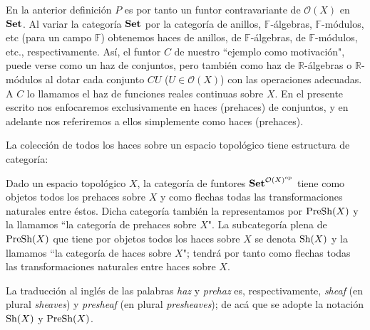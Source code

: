 En la anterior definición $P$ es por tanto un funtor contravariante de $\mathcal{O}(X)$ en $\normalfont{\textbf{Set}}$. Al variar la categoría $\normalfont{\textbf{Set}}$ por la categoría de anillos, $\mathbb{F}$-álgebras, $\mathbb{F}$-módulos, etc (para un campo $\mathbb{F}$) obtenemos haces de anillos, de $\mathbb{F}$-álgebras, de $\mathbb{F}$-módulos, etc., respectivamente. Así, el funtor $C$ de nuestro ``ejemplo como motivación", puede verse como un haz de conjuntos, pero también como haz de $\mathbb{R}$-álgebras o $\mathbb{R}$-módulos al dotar cada conjunto $CU$ ($U\in \mathcal{O}(X)$) con las operaciones adecuadas. A $C$ lo llamamos el haz de funciones reales continuas sobre $X$. En el presente escrito nos enfocaremos exclusivamente en haces (prehaces) de conjuntos, y en adelante nos referiremos a ellos simplemente como haces (prehaces).

La colección de todos los haces sobre un espacio topológico tiene estructura de categoría:
\begin{Def}
   Dado un espacio topológico $X$, la categoría de funtores $\normalfont{\textbf{Set}}^{{\mathcal{O}(X)}^{\text{op}}}$ tiene como objetos todos los prehaces sobre $X$ y como flechas todas las transformaciones naturales entre éstos. Dicha categoría también la representamos por $\normalfont{\text{PreSh}} (X)$ y la llamamos ``la categoría de prehaces sobre $X$". La subcategoría plena de $\normalfont{\text{PreSh}} (X)$ que tiene por objetos todos los haces sobre $X$ se denota $\normalfont{\text{Sh}}(X)$ y la llamamos ``la categoría de haces sobre $X$"; tendrá por tanto como flechas todas las transformaciones naturales entre haces sobre $X$. 
\end{Def}
La traducción al inglés de las palabras \textit{haz} y \textit{prehaz} es, respectivamente, \textit{sheaf} (en plural \textit{sheaves}) y \textit{presheaf} (en plural \textit{presheaves}); de acá que se adopte la notación $\normalfont{\text{Sh}} (X)$ y $\normalfont{\text{PreSh}} (X)$.
